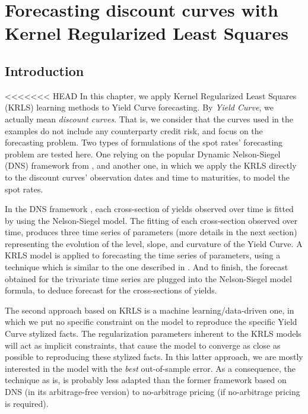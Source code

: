 %
\chapter{Forecasting discount curves with Kernel Regularized Least Squares}
\label{sec:discount_curve_krls}


\section{Introduction}

<<<<<<< HEAD
In this chapter, we apply Kernel Regularized Least Squares (KRLS) learning methods to Yield Curve forecasting. By \textit{Yield Curve}, we actually mean \textit{discount curves}. That is, we consider that the curves used in the examples do not include any counterparty credit risk, and focus on the forecasting problem. Two types of formulations of the spot rates' forecasting problem are tested here. One relying on the popular Dynamic Nelson-Siegel (DNS) framework from \cite{diebold2006forecasting}, and another one, in which we apply the KRLS directly to the discount curves' observation dates and time to maturities, to model the spot rates.

\medskip

In the DNS framework \cite{diebold2006forecasting}, each cross-section of yields observed over time is fitted by using the Nelson-Siegel \cite{nelson1987parsimonious} model. The fitting of each cross-section observed over time, produces three time series of parameters (more details in the next section) representing the evolution of the level, slope, and curvature of the Yield Curve. A KRLS model is applied to forecasting  the time series of parameters, using a technique which is similar to the one described in \cite{exterkate2016nonlinear}. And to finish, the forecast obtained for the trivariate time series are plugged into the Nelson-Siegel model formula, to deduce forecast for the cross-sections of yields.

\medskip

The second approach based on KRLS is a machine learning/data-driven one, in which we put no  specific constraint on the model to reproduce the specific Yield Curve stylized facts. The regularization parameters inherent to the KRLS models will act as implicit constraints, that cause the model to converge as close as possible to reproducing these stylized facts. In this latter approach, we are mostly interested in the model with the {\it best} out-of-sample error. As a consequence, the technique as is, is probably less adapted than the former framework based on DNS (in its arbitrage-free version) to no-arbitrage pricing (if no-arbitrage pricing is required).

